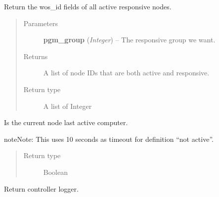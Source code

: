\documentclass[letterpaper,10pt,english]{sphinxmanual}
\begin{document}

\begin{fulllineitems}
\label{controller:controller.computer.get_active_responsive_nodes}
Return the wos\_id fields of all active responsive nodes.
\begin{quote}\begin{description}
\item[{Parameters}] \leavevmode
\textbf{pgm\_group} (\emph{Integer}) -- The responsive group we want.

\item[{Returns}] \leavevmode
A list of node IDs that are both active and responsive.

\item[{Return type}] \leavevmode
A list of Integer

\end{description}\end{quote}

\end{fulllineitems}


\begin{fulllineitems}
\label{controller:controller.computer.last_active_computer}
Is the current node last active computer.

\begin{notice}{note}{Note:}
This uses 10 seconds as timeout for definition ``not active''.
\end{notice}
\begin{quote}\begin{description}
\item[{Return type}] \leavevmode
Boolean

\end{description}\end{quote}

\end{fulllineitems}


\begin{fulllineitems}
\label{controller:controller.computer.logger}
Return controller logger.

\end{fulllineitems}
\end{document}
